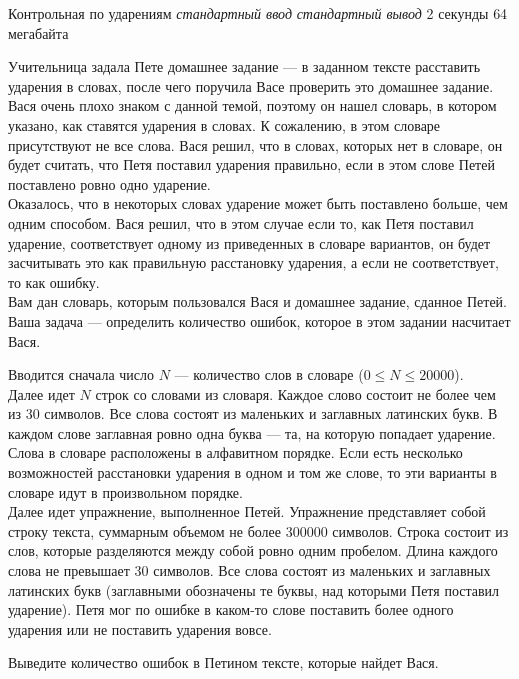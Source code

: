 \begin{problem}%
{Контрольная по ударениям}%
{\textsl{стандартный ввод}}%
{\textsl{стандартный вывод}}%
{2 секунды}%
{64 мегабайта}%
{}

Учительница задала Пете домашнее задание — в заданном тексте расставить ударения в словах, после чего поручила Васе проверить это домашнее задание. Вася очень плохо знаком с данной темой, поэтому он нашел словарь, в котором указано, как ставятся ударения в словах. К сожалению, в этом словаре присутствуют не все слова. Вася решил, что в словах, которых нет в словаре, он будет считать, что Петя поставил ударения правильно, если в этом слове Петей поставлено ровно одно ударение.\\

Оказалось, что в некоторых словах ударение может быть поставлено больше, чем одним способом. Вася решил, что в этом случае если то, как Петя поставил ударение, соответствует одному из приведенных в словаре вариантов, он будет засчитывать это как правильную расстановку ударения, а если не соответствует, то как ошибку.\\

Вам дан словарь, которым пользовался Вася и домашнее задание, сданное Петей. Ваша задача — определить количество ошибок, которое в этом задании насчитает Вася.\\

\InputFile

Вводится сначала число $N$ — количество слов в словаре ($0 \le N \le 20000$).\\

Далее идет $N$ строк со словами из словаря. Каждое слово состоит не более чем из $30$ символов. Все слова состоят из маленьких и заглавных латинских букв. В каждом слове заглавная ровно одна буква — та, на которую попадает ударение. Слова в словаре расположены в алфавитном порядке. Если есть несколько возможностей расстановки ударения в одном и том же слове, то эти варианты в словаре идут в произвольном порядке.\\

Далее идет упражнение, выполненное Петей. Упражнение представляет собой строку текста, суммарным объемом не более $300000$ символов. Строка состоит из слов, которые разделяются между собой ровно одним пробелом. Длина каждого слова не превышает $30$ символов. Все слова состоят из маленьких и заглавных латинских букв (заглавными обозначены те буквы, над которыми Петя поставил ударение). Петя мог по ошибке в каком-то слове поставить более одного ударения или не поставить ударения вовсе.\\

\OutputFile

Выведите количество ошибок в Петином тексте, которые найдет Вася.

\Examples

\begin{example}
%
%
\end{example}
\end{problem}
